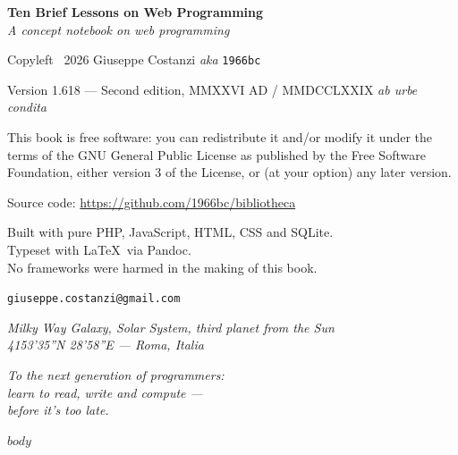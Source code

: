 \documentclass[11pt,a4paper,oneside]{book}
\providecommand{\textcopyleft}{\reflectbox{\copyright}}
\begin{document}
{\small

\textbf{Ten Brief Lessons on Web Programming}\\
\textit{A concept notebook on web programming}

\vspace{1em}

Copyleft \textcopyleft\ 2026 Giuseppe Costanzi \textit{aka} \texttt{1966bc}

\vspace{1em}

Version 1.618 --- Second edition, MMXXVI AD / MMDCCLXXIX \textit{ab urbe condita}

\vspace{1em}

This book is free software: you can redistribute it and/or modify
it under the terms of the GNU General Public License as published by
the Free Software Foundation, either version 3 of the License, or
(at your option) any later version.

\vspace{1em}

Source code: \url{https://github.com/1966bc/bibliotheca}

\vspace{1em}

Built with pure PHP, JavaScript, HTML, CSS and SQLite.\\
Typeset with \LaTeX\ via Pandoc.\\
No frameworks were harmed in the making of this book.

\vspace{1em}

\texttt{giuseppe.costanzi@gmail.com}

\vspace{1em}

{\footnotesize\itshape
Milky Way Galaxy, Solar System, third planet from the Sun\\
41\textdegree{}53'35''N \textdegree{}28'58''E --- Roma, Italia}
}

\newpage

\thispagestyle{empty}
\vspace*{5cm}
\begin{center}
\itshape\large
To the next generation of programmers:\\
learn to read, write and compute ---\\
before it's too late.
\end{center}
\newpage

{
\setlength{\parskip}{0.1em plus 0.1em}
\tableofcontents
}
\newpage

\setcounter{chapter}{-1}

$body$
\end{document}
